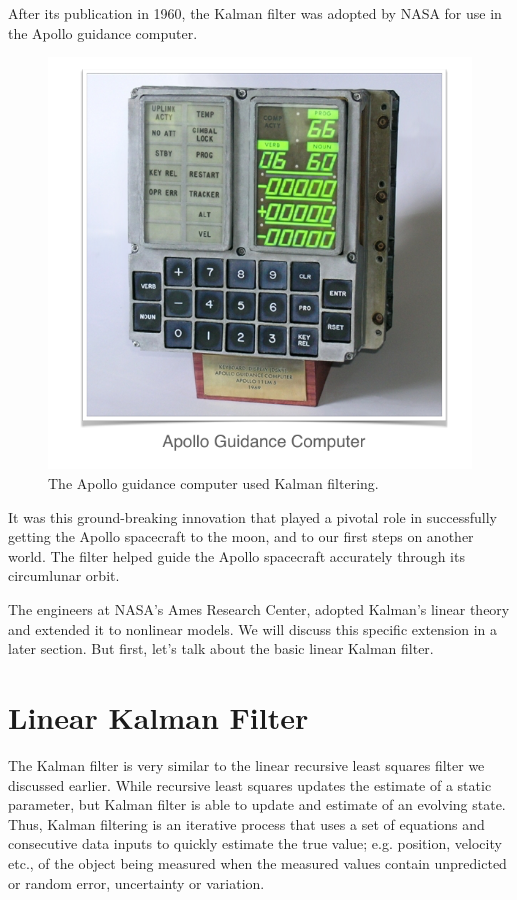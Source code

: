 After its publication in 1960, the Kalman filter was adopted by NASA for use in
the Apollo guidance computer. 

\begin{figure}[!htb]
\begin{center}
\includegraphics[scale=0.280]{img/kalman_filter/apollo_guidance_computer.jpeg}
\end{center}
\caption{The Apollo guidance computer used Kalman filtering.}
\label{apollo_guidance_computer}
\end{figure}

It was this ground-breaking innovation
that played a pivotal role in successfully getting
the Apollo spacecraft to the moon, and to our first steps on another world. The filter helped guide the Apollo spacecraft accurately
through its circumlunar orbit. 

The engineers at
NASA's Ames Research Center, adopted Kalman's linear theory and
extended it to nonlinear models. We will discuss this specific extension
in a later section. But first, let's talk about
the basic linear Kalman filter. 

\section{Linear Kalman Filter}


The Kalman filter is very similar to the linear recursive least squares
filter we discussed earlier. While recursive least squares updates
the estimate of a static parameter, but Kalman filter is able to update
and estimate of an evolving state. Thus, Kalman filtering is an iterative process that uses a set of equations and consecutive data inputs to quickly estimate the 
true value; e.g. position, velocity etc., of the object being measured when the measured values contain unpredicted or 
random error, uncertainty or variation.


